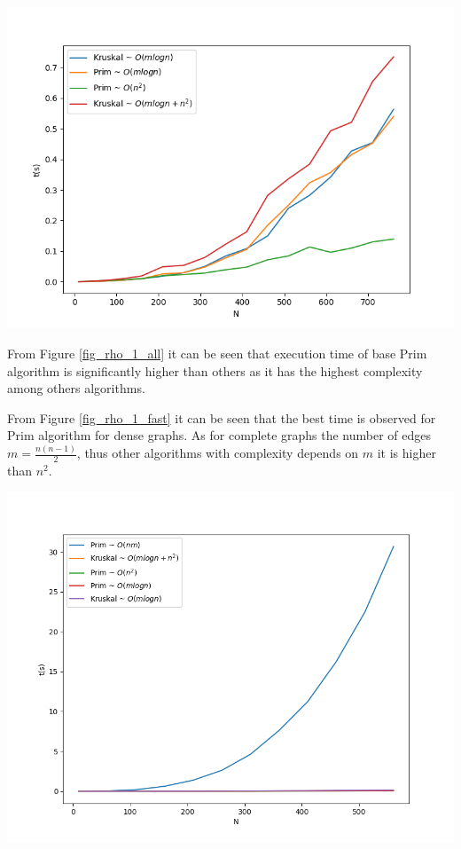 \begin{center}
    \includegraphics[width=0.75\linewidth]{../results/rho_1_fast.png}
    \label{fig_rho_1_fast}
\end{center}


From Figure \ref{fig_rho_1_all} it can be seen that execution time of base Prim algorithm is significantly higher than others as it has the highest complexity among others algorithms.

From Figure \ref{fig_rho_1_fast} it can be seen that the best time is observed for Prim algorithm for dense graphs. As for complete graphs the number of edges $m = \frac{n(n - 1)}{2}$, thus other algorithms with complexity depends on $m$ it is higher than $n^2$.

\begin{center}
    \includegraphics[width=0.75\linewidth]{../results/rho_0.5_all.png}
    \label{fig_rho_0.5_all}
\end{center}

